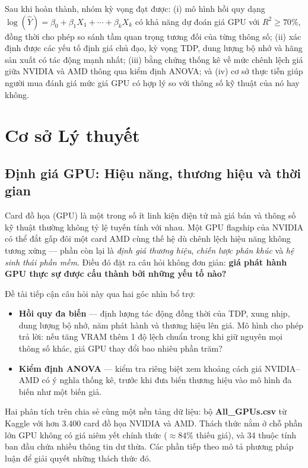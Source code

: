 \documentclass[a4paper]{article}
\begin{document}
Sau khi hoàn thành, nhóm kỳ vọng đạt được: (i) mô hình hồi quy dạng $\log(\hat{Y}) = \beta_0 + \beta_1 X_1 + \cdots + \beta_k X_k$ có khả năng dự đoán giá GPU với $R^2 \geq 70\%$, đồng thời cho phép so sánh tầm quan trọng tương đối của từng thông số; (ii) xác định được các yếu tố định giá chủ đạo, kỳ vọng TDP, dung lượng bộ nhớ và hãng sản xuất có tác động mạnh nhất; (iii) bằng chứng thống kê về mức chênh lệch giá giữa NVIDIA và AMD thông qua kiểm định ANOVA; và (iv) cơ sở thực tiễn giúp người mua đánh giá mức giá GPU có hợp lý so với thông số kỹ thuật của nó hay không.

\section{Cơ sở Lý thuyết}

\subsection{Định giá GPU: Hiệu năng, thương hiệu và thời gian}

Card đồ họa (GPU) là một trong số ít linh kiện điện tử mà giá bán và thông số kỹ thuật thường không tỷ lệ tuyến tính với nhau. Một GPU flagship của NVIDIA có thể đắt gấp đôi một card AMD cùng thế hệ dù chênh lệch hiệu năng không tương xứng --- phần còn lại là \textit{định giá thương hiệu}, \textit{chiến lược phân khúc} và \textit{hệ sinh thái phần mềm}. Điều đó đặt ra câu hỏi không đơn giản: \textbf{giá phát hành GPU thực sự được cấu thành bởi những yếu tố nào?}

Đề tài tiếp cận câu hỏi này qua hai góc nhìn bổ trợ:

\begin{itemize}
  \item \textbf{Hồi quy đa biến} --- định lượng tác động đồng thời của TDP, xung nhịp, dung lượng bộ nhớ, năm phát hành và thương hiệu lên giá. Mô hình cho phép trả lời: nếu tăng VRAM thêm 1 độ lệch chuẩn trong khi giữ nguyên mọi thông số khác, giá GPU thay đổi bao nhiêu phần trăm?
  \item \textbf{Kiểm định ANOVA} --- kiểm tra riêng biệt xem khoảng cách giá NVIDIA--AMD có ý nghĩa thống kê, trước khi đưa biến thương hiệu vào mô hình đa biến như một biến giả.
\end{itemize}

Hai phân tích trên chia sẻ cùng một nền tảng dữ liệu: bộ \textbf{All\_GPUs.csv} từ Kaggle với hơn 3.400 card đồ họa NVIDIA và AMD. Thách thức nằm ở chỗ phần lớn GPU không có giá niêm yết chính thức ($\approx 84\%$ thiếu giá), và 34 thuộc tính ban đầu chứa nhiều thông tin dư thừa. Các phần tiếp theo mô tả phương pháp luận để giải quyết những thách thức đó.
\end{document}
